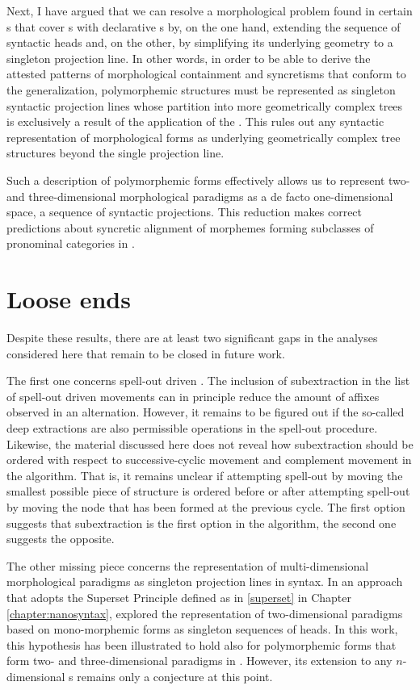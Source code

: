 \par 
Next, I have argued that we can resolve a morphological  problem found in certain  s that cover s with declarative s by, on the one hand, extending the sequence of syntactic heads  and, on the other, by simplifying its underlying geometry to a singleton projection line. In other words, in order to be able to derive the attested patterns of morphological containment and syncretisms that conform to the  generalization, polymorphemic structures must be represented as singleton syntactic projection lines whose partition into more geometrically complex trees is exclusively a result of the application of the . This rules out any syntactic representation of morphological forms as underlying geometrically complex tree structures beyond the single projection line.
\par
Such a description of polymorphemic forms effectively allows us to represent two- and three-dimensional morphological paradigms as a de facto one-dimensional space, a sequence of syntactic projections. This reduction makes correct predictions about syncretic alignment of  morphemes forming subclasses of pronominal categories in .

\section{Loose ends}\largerpage

Despite these results, there are at least two significant gaps in the analyses considered here that remain to be closed in future work.
\par
The first one concerns spell-out driven . The inclusion of subextraction in the list of spell-out driven movements can in principle reduce  the amount of affixes observed in an alternation. However, it remains to be figured out if the so-called deep extractions are also permissible operations in the spell-out procedure. Likewise, the material discussed here does not reveal how subextraction should be ordered with respect to successive-cyclic movement and complement movement in the algorithm.  That is, it remains unclear if attempting spell-out by moving the smallest possible piece of structure is ordered before or after attempting spell-out by moving the node that has been formed at the previous cycle. The first option suggests that subextraction is the first option in the algorithm, the second one suggests the opposite.
\par
The other missing piece concerns the representation of multi-dimensional morphological paradigms as singleton projection lines in syntax. In an approach that adopts the Superset Principle defined as in \ref{superset} in Chapter \ref{chapter:nanosyntax}, \cite{CahaPantcheva2012} explored the representation of two-dimensional paradigms based on mono-morphemic forms as singleton sequences of heads. In this work, this hypothesis has been illustrated to hold also for polymorphemic forms that form two- and three-dimensional paradigms in . However, its extension to any $n$-dimensional s remains only a conjecture at this point.
